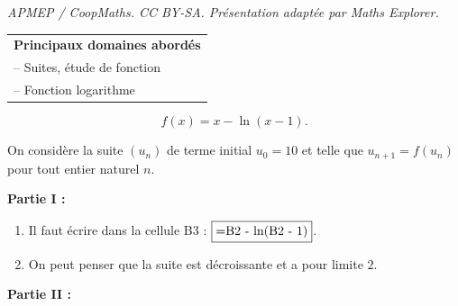 \documentclass[10pt]{article}
\begin{document}
\noindent\textit{APMEP / CoopMaths. CC BY-SA. Présentation adaptée par Maths Explorer.}\par\medskip
\medskip

\begin{tabular}{|l|}\hline
\textbf{Principaux domaines abordés}\\
-- Suites, étude de fonction\\
-- Fonction logarithme\\ \hline
\end{tabular}

\medskip



\[f(x) = x - \ln (x - 1).\]

On considère la suite $\left(u_n\right)$ de terme initial $u_0 = 10$ et telle que $u_{n+1} = f\left(u_n\right)$ pour tout entier naturel $n$.

\bigskip

\textbf{Partie I :}

\medskip





















\begin{enumerate}
\item 
Il faut écrire dans la cellule B3 : $\fbox{=B2 - ln(B2 - 1)}$.
\item 
On peut penser que la suite est décroissante et a pour limite $2$.
\end{enumerate}

\bigskip

\textbf{Partie II :}

\medskip
\end{document}
